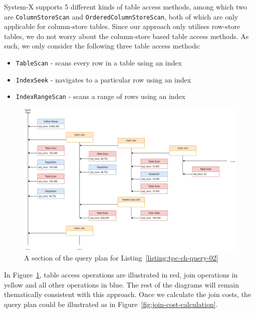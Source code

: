 System-X supports 5 different kinds of table access methods, among which two are \texttt{ColumnStoreScan} and \texttt{OrderedColumnStoreScan}, both of which are only applicable for column-store tables. Since our approach only utilises row-store tables, we do not worry about the column-store based table access methods. As such, we only consider the following three table access methods:

\begin{itemize}
    \item \texttt{TableScan} - scans every row in a table using an index
    \item \texttt{IndexSeek} - navigates to a particular row using an index
    \item \texttt{IndexRangeScan} - scans a range of rows using an index
\end{itemize}

\begin{figure}[ht]
  \centering
  \includegraphics[width=\linewidth]{figures/query_02_plan_01.png}
  \caption{A section of the query plan for Listing~\ref{listing:tpc-ch-query-02}}
  \label{fig:tpc-ch-query-02-plan}
\end{figure}

In Figure~\ref{fig:tpc-ch-query-02-plan}, table access operations are illustrated in red, join operations in yellow and all other operations in blue. The rest of the diagrams will remain thematically consistent with this approach. Once we calculate the join costs, the query plan could be illustrated as in Figure~\ref{fig:join-cost-calculation}.

